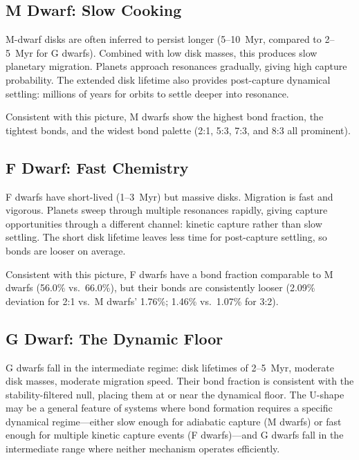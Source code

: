 \documentclass[twocolumn,usenatbib]{mnras}
\begin{document}
\subsection{M Dwarf: Slow Cooking}

M-dwarf disks are often inferred to persist longer (5--10~Myr, compared to
2--5~Myr for G dwarfs)\citep{yasui2010,haisch2001}. Combined with low disk
masses, this produces slow planetary migration. Planets approach resonances
gradually, giving high capture probability. The extended disk lifetime also
provides post-capture dynamical settling: millions of years for orbits to
settle deeper into resonance.

Consistent with this picture, M dwarfs show the highest bond fraction, the
tightest bonds, and the widest bond palette (2:1, 5:3, 7:3, and 8:3 all
prominent).

\subsection{F Dwarf: Fast Chemistry}

F dwarfs have short-lived (1--3~Myr) but massive
disks\citep{sicilia_aguilar}. Migration is fast and vigorous. Planets sweep
through multiple resonances rapidly, giving capture opportunities through a
different channel: kinetic capture rather than slow settling. The short disk
lifetime leaves less time for post-capture settling, so bonds are looser on
average.

Consistent with this picture, F dwarfs have a bond fraction comparable to M
dwarfs (56.0\% vs.\ 66.0\%), but their bonds are consistently looser (2.09\%
deviation for 2:1 vs.\ M dwarfs' 1.76\%; 1.46\% vs.\ 1.07\% for 3:2).

\subsection{G Dwarf: The Dynamic Floor}

G dwarfs fall in the intermediate regime: disk lifetimes of 2--5~Myr, moderate
disk masses, moderate migration speed. Their bond fraction is consistent with
the stability-filtered null, placing them at or near the dynamical floor. The
U-shape may be a general feature of systems where bond formation requires a
specific dynamical regime---either slow enough for adiabatic capture (M dwarfs)
or fast enough for multiple kinetic capture events (F dwarfs)---and G dwarfs
fall in the intermediate range where neither mechanism operates efficiently.
\end{document}
